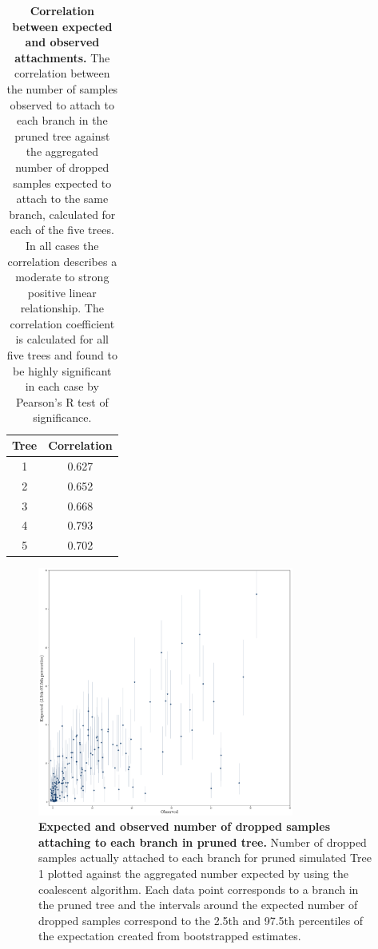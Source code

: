 \documentclass[11pt,oneside,letterpaper]{article}
\begin{document}
\begin{table}[]
\centering
\begin{tabular}{cc}
\hline
Tree & Correlation \\ \hline
1    & 0.627       \\
2    & 0.652       \\
3    & 0.668       \\
4    & 0.793       \\
5    & 0.702       \\ \hline
\end{tabular}
\caption{\textbf{Correlation between expected and observed attachments.} 
The correlation between the number of samples observed to attach to each branch in the pruned tree against the aggregated number of dropped samples expected to attach to the same branch, calculated for each of the five trees. In all cases the correlation describes a moderate to strong positive linear relationship. The correlation coefficient is calculated for all five trees and found to be highly significant in each case by Pearson's R test of significance.}
\label{t-correlations}
\end{table}

\begin{figure}[h]
 \centering
	\includegraphics[width=0.75\textwidth]{figures/correlation-percentiles}
	\caption{\textbf{Expected and observed number of dropped samples attaching to each branch in pruned tree.}
	Number of dropped samples actually attached to each branch for pruned simulated Tree 1 plotted against the aggregated number expected by using the coalescent algorithm. Each data point corresponds to a branch in the pruned tree and the intervals around the expected number of dropped samples correspond to the 2.5th and 97.5th percentiles of the expectation created from bootstrapped estimates.
	}
	\label{F-corr}
\end{figure}
\end{document}
